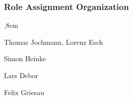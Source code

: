 \subsubsection{Role Assignment Organization}
\begin{description}
	,8cm
	\item[Advisor:] Thomas Jochmann, Lorenz Esch
	
	\item[Team leader:] Simon Heinke
	
	\item[Build master:] Lars Debor
	
	\item[Version management :] Felix Griesau
	
\end{description}

\clearpage